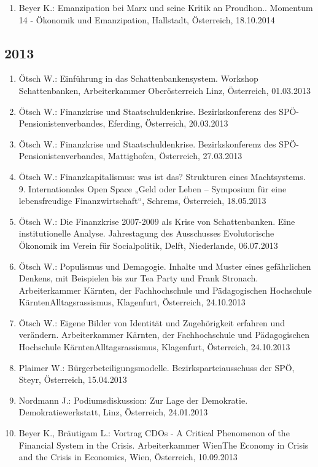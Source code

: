 \begin{enumerate}
	\item Beyer K.: Emanzipation bei Marx und seine Kritik an Proudhon.. Momentum 14 - Ökonomik und Emanzipation, Hallstadt, Österreich, 18.10.2014
\end{enumerate}
\subsection*{2013}

\begin{enumerate}
	\item Ötsch W.: Einführung in das Schattenbankensystem. Workshop Schattenbanken, Arbeiterkammer Oberösterreich Linz, Österreich, 01.03.2013
	\item Ötsch W.: Finanzkrise und Staatschuldenkrise. Bezirkskonferenz des SPÖ-Pensionistenverbandes, Eferding, Österreich, 20.03.2013
	\item Ötsch W.: Finanzkrise und Staatschuldenkrise. Bezirkskonferenz des SPÖ-Pensionistenverbandes, Mattighofen, Österreich, 27.03.2013
	\item Ötsch W.: Finanzkapitalismus: was ist das? Strukturen eines Machtsystems. 9. Internationales Open Space „Geld oder Leben – Symposium für eine lebensfreudige Finanzwirtschaft“, Schrems, Österreich, 18.05.2013
	\item Ötsch W.: Die Finanzkrise 2007-2009 als Krise von Schattenbanken. Eine institutionelle Analyse. Jahrestagung des Ausschusses Evolutorische Ökonomik im Verein für Socialpolitik, Delft, Niederlande, 06.07.2013
	\item Ötsch W.: Populismus und Demagogie. Inhalte und Muster eines gefährlichen Denkens, mit Beispielen bis zur Tea Party und Frank Stronach. Arbeiterkammer Kärnten, der Fachhochschule und Pädagogischen Hochschule KärntenAlltagsrassismus, Klagenfurt, Österreich, 24.10.2013
	\item Ötsch W.: Eigene Bilder von Identität und Zugehörigkeit erfahren und verändern. Arbeiterkammer Kärnten, der Fachhochschule und Pädagogischen Hochschule KärntenAlltagsrassismus, Klagenfurt, Österreich, 24.10.2013
	\item Plaimer W.: Bürgerbeteiligungsmodelle. Bezirksparteiausschuss der SPÖ, Steyr, Österreich, 15.04.2013
	\item Nordmann J.: Podiumsdiskussion: Zur Lage der Demokratie. Demokratiewerkstatt, Linz, Österreich, 24.01.2013
	\item Beyer K., Bräutigam L.: Vortrag CDOs - A Critical Phenomenon of the Financial System in the Crisis. Arbeiterkammer WienThe Economy in Crisis and the Crisis in Economics, Wien, Österreich, 10.09.2013
\end{enumerate}

